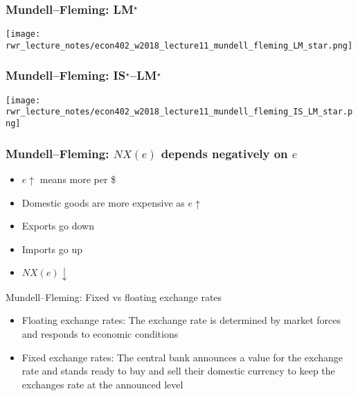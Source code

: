 \documentclass[presentation,dvipsnames]{beamer}
\renewcommand{\pounds}{\text{\textsterling}{ }}
\begin{document}
\begin{frame}
\frametitle{Mundell--Fleming: LM$^{\star}$}
\centering
\texttt{[image: rwr\_lecture\_notes/econ402\_w2018\_lecture11\_mundell\_fleming\_LM\_star.png]}
\end{frame}

\begin{frame}
\frametitle{Mundell--Fleming: IS$^{\star}$--LM$^{\star}$}
\centering
\texttt{[image: rwr\_lecture\_notes/econ402\_w2018\_lecture11\_mundell\_fleming\_IS\_LM\_star.png]}
\end{frame}




\begin{frame}
\frametitle{Mundell--Fleming: $NX(e)$ depends negatively on $e$}
\begin{itemize}[label={--}]
\item $e \uparrow$ means more \pounds per \$
\item Domestic goods are more expensive as $e \uparrow$
\item Exports go down
\item Imports go up
\item $NX(e) \downarrow$
\end{itemize}
\end{frame}

\begin{frame}[label=sec-6-3]{Mundell--Fleming: Fixed vs floating exchange rates}
\begin{itemize}[label={--}]
\item Floating exchange rates: The exchange rate is determined by market forces and responds to economic conditions
\item Fixed exchange rates: The central bank announces a value for the exchange rate and stands ready to buy and sell their domestic currency to keep the exchanges rate at the announced level
\end{itemize}
\end{frame}
\end{document}
